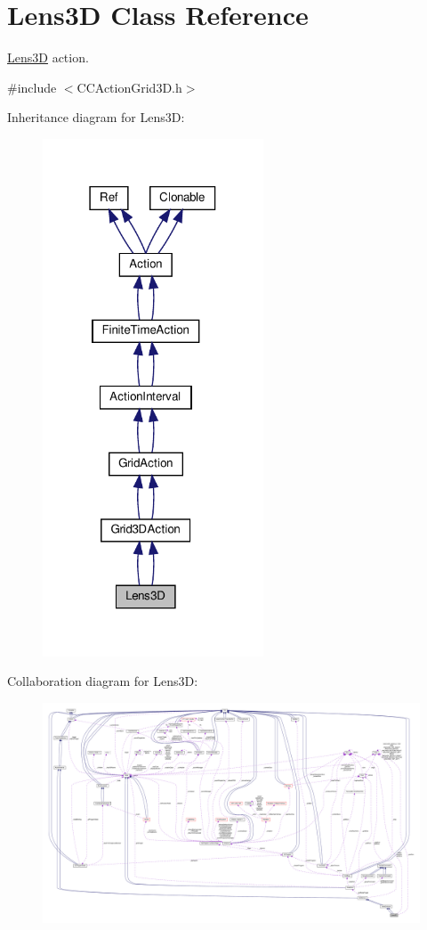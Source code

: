 \hypertarget{classLens3D}{}\section{Lens3D Class Reference}
\label{classLens3D}


\hyperlink{classLens3D}{Lens3D} action.  




{\ttfamily \#include $<$C\+C\+Action\+Grid3\+D.\+h$>$}



Inheritance diagram for Lens3D\+:
\nopagebreak
\begin{figure}[H]
\begin{center}
\leavevmode
\includegraphics[width=186pt]{classLens3D__inherit__graph}
\end{center}
\end{figure}


Collaboration diagram for Lens3D\+:
\nopagebreak
\begin{figure}[H]
\begin{center}
\leavevmode
\includegraphics[width=350pt]{classLens3D__coll__graph}
\end{center}
\end{figure}

